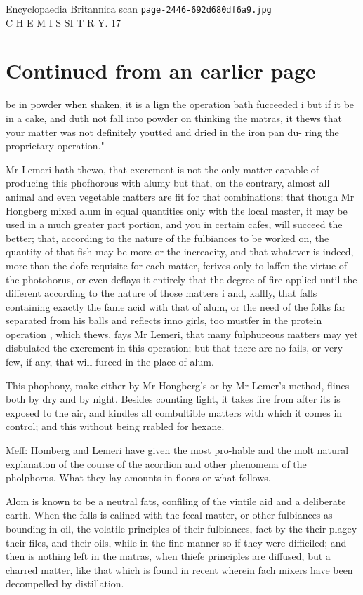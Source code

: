 \documentclass{article}
\begin{document}
\begin{center}
{\Large Encyclopaedia Britannica scan \texttt{page-2446-692d680df6a9.jpg}}\\[0.5em]
C H E M I S SI T R Y. 17
\end{center}
\section*{Continued from an earlier page}
be in powder when shaken, it is a lign the operation bath fucceeded i but if it be in a cake, and duth not fall into powder on thinking the matras, it thews that your matter was not definitely youtted and dried in the iron pan du- ring the proprietary operation."

Mr Lemeri hath thewo, that excrement is not the only matter capable of producing this phofhorous with alumy but that, on the contrary, almost all animal and even vegetable matters are fit for that combinations; that though Mr Hongberg mixed alum in equal quantities only with the local master, it may be used in a much greater part portion, and you in certain cafes, will succeed the better; that, according to the nature of the fulbiances to be worked on, the quantity of that fish may be more or the increacity, and that whatever is indeed, more than the dofe requisite for each matter, ferives only to laffen the virtue of the photohorus, or even deflays it entirely that the degree of fire applied until the different according to the nature of those matters i and, kallly, that falls containing exactly the fame acid with that of alum, or the need of the folks far separated from his balls and reflects inno girls, too mustfer in the protein operation , which thews, fays Mr Lemeri, that many fulphureous matters may yet disbulated the excrement in this operation; but that there are no fails, or very few, if any, that will furced in the place of alum.

This phophony, make either by Mr Hongberg’s or by Mr Lemer’s method, flines both by dry and by night. Besides counting light, it takes fire from after its is exposed to the air, and kindles all combultible matters with which it comes in control; and this without being rrabled for hexane.

Meff: Homberg and Lemeri have given the most pro-hable and the molt natural explanation of the course of the acordion and other phenomena of the pholphorus. What they lay amounts in floors or what follows.

Alom is known to be a neutral fats, confiling of the vintile aid and a deliberate earth. When the falls is calined with the fecal matter, or other fulbiances as bounding in oil, the volatile principles of their fulbiances, fact by the their plagey their files, and their oils, while in the fine manner so if they were difficiled; and then is nothing left in the matras, when thiefe principles are diffused, but a charred matter, like that which is found in recent wherein fach mixers have been decompelled by distillation.
\end{document}
